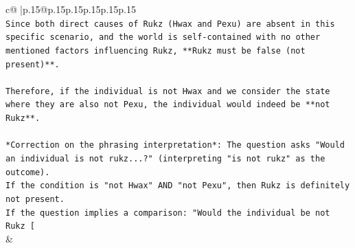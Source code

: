 \documentclass{article}
\begin{document}
{\begin{supertabular}{c@{$\;$}|p{.15\linewidth}@{}p{.15\linewidth}p{.15\linewidth}p{.15\linewidth}p{.15\linewidth}p{.15\linewidth}}
{{{\\ 
\texttt{Since both direct causes of Rukz (Hwax and Pexu) are absent in this specific scenario, and the world is self{-}contained with no other mentioned factors influencing Rukz, **Rukz must be false (not present)**.} \\
\\ 
\texttt{Therefore, if the individual is not Hwax and we consider the state where they are also not Pexu, the individual would indeed be **not Rukz**.} \\
\\ 
\texttt{*Correction on the phrasing interpretation*: The question asks "Would an individual is not rukz...?" (interpreting "is not rukz" as the outcome).} \\
\texttt{If the condition is "not Hwax" AND "not Pexu", then Rukz is definitely not present.} \\
\texttt{If the question implies a comparison: "Would the individual be not Rukz {[}} \\
            }
        }
    }
    & \\ \\


\end{supertabular}}
\end{document}
